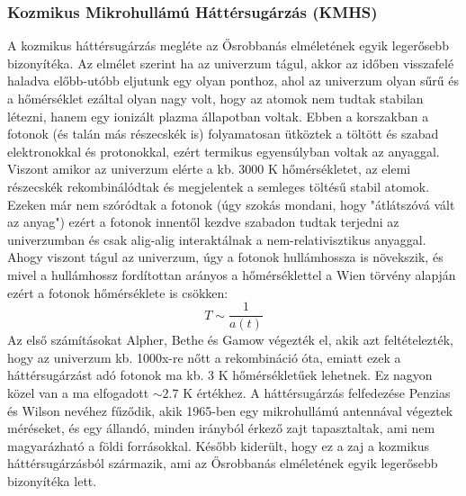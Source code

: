 \documentclass[../main.tex]{subfiles}
\begin{document}
\subsubsection*{Kozmikus Mikrohullámú Háttérsugárzás (KMHS)}
A kozmikus háttérsugárzás megléte az Ősrobbanás elméletének egyik legerősebb bizonyítéka. Az elmélet szerint ha az univerzum tágul, akkor az időben visszafelé haladva előbb-utóbb eljutunk
egy olyan ponthoz, ahol az univerzum olyan sűrű és a hőmérséklet ezáltal olyan nagy volt, hogy az atomok nem tudtak stabilan létezni, hanem egy ionizált plazma állapotban voltak.
Ebben a korszakban a fotonok (és talán más részecskék is) folyamatosan ütköztek a töltött és szabad elektronokkal és protonokkal, ezért termikus egyensúlyban voltak az anyaggal. Viszont amikor az univerzum elérte
a kb. 3000 K hőmérsékletet, az elemi részecskék rekombinálódtak és megjelentek a semleges töltésű stabil atomok. Ezeken már nem szóródtak a fotonok (úgy szokás mondani, hogy "átlátszóvá vált az anyag")
ezért a fotonok innentől kezdve szabadon tudtak terjedni az univerzumban és csak alig-alig interaktálnak a nem-relativisztikus anyaggal. Ahogy viszont tágul az univerzum, úgy a fotonok hullámhossza is növekszik,
és mivel a hullámhossz fordítottan arányos a hőmérséklettel a Wien törvény alapján ezért a fotonok hőmérséklete is csökken:
\begin{equation}
    T \sim \frac{1}{a(t)}
\end{equation}
Az első számításokat Alpher, Bethe és Gamow végezték el, akik azt feltételezték, hogy az univerzum kb. 1000x-re nőtt a rekombináció óta, emiatt ezek a háttérsugárzást adó fotonok ma kb. 3 K hőmérsékletűek lehetnek.
Ez nagyon közel van a ma elfogadott $\sim 2.7$ K értékhez. A háttérsugárzás felfedezése Penzias és Wilson nevéhez fűződik, akik 1965-ben egy mikrohullámú antennával végeztek méréseket, és egy állandó, minden irányból érkező zajt tapasztaltak, ami
nem magyarázható a földi forrásokkal. Később kiderült, hogy ez a zaj a kozmikus háttérsugárzásból származik, ami az Ősrobbanás elméletének egyik legerősebb bizonyítéka lett.
\end{document}
